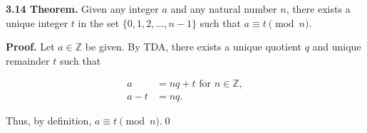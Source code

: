 \documentclass[12pt]{article}
\begin{document}
\noindent\textbf{3.14 Theorem.} Given any integer $a$ and any natural number $n$, there exists a unique integer $t$ in the set $\{0,1,2,...,n-1\}$ such that $a\equiv t\pmod n$.

\bigskip

\noindent\textbf{Proof.} Let $a\in\mathbb{Z}$ be given. By TDA, there exists a unique quotient $q$ and unique remainder $t$ such that

\begin{align*}
a &= nq + t \text{ for } n\in\mathbb{Z}, \\
a-t &= nq.
\end{align*}

\noindent Thus, by definition, $a\equiv t\pmod n$.\qed
\end{document}
